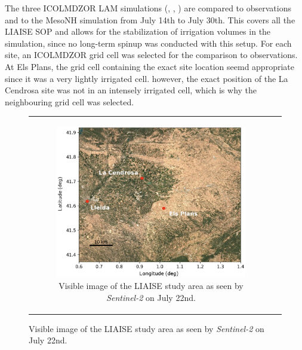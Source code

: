 \hfill

The three ICOLMDZOR LAM simulations (\noirr, \irr, \irrboost) are compared to observations and to the MesoNH simulation from July 14th to July 30th. This covers all the LIAISE SOP and allows for the stabilization of irrigation volumes in the \irrboost simulation, since no long-term spinup was conducted with this setup.
For each site, an ICOLMDZOR grid cell was selected for the comparison to observations. At Els Plans, the grid cell containing the exact site location seemd appropriate since it was a very lightly irrigated cell. however, the exact position of the La Cendrosa site was not in an intensely irrigated cell, which is why the neighbouring grid cell was selected.

\begin{figure}[hbtp]
    \centering
    \begin{tabular}{cc}
        \begin{subfigure}[t]{0.44\textwidth}
            \caption{Visible image of the LIAISE study area as seen by \textit{Sentinel-2} on July 22nd.}
            \includegraphics[width=\textwidth]{images/chap5/liaise_overview_lunel.png}
        \end{subfigure} &


\end{tabular}
\end{figure}
